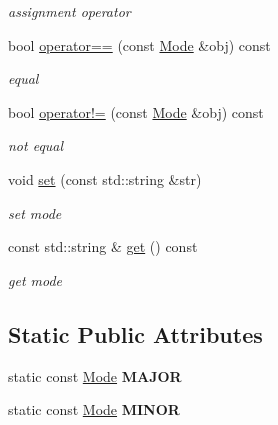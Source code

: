 \begin{DoxyCompactItemize}
\begin{DoxyCompactList}\small\item\em assignment operator \end{DoxyCompactList}\item 
bool \hyperlink{classsinsy_1_1Mode_a9a90d9c77d25798d8b4dd3c427a7cd3f}{operator==} (const \hyperlink{classsinsy_1_1Mode}{\-Mode} \&obj) const 
\begin{DoxyCompactList}\small\item\em equal \end{DoxyCompactList}\item 
bool \hyperlink{classsinsy_1_1Mode_a585d85c933d17df58e76a5ce5770a5b8}{operator!=} (const \hyperlink{classsinsy_1_1Mode}{\-Mode} \&obj) const 
\begin{DoxyCompactList}\small\item\em not equal \end{DoxyCompactList}\item 
void \hyperlink{classsinsy_1_1Mode_a406a7630df242c2e2cc0d751d684af32}{set} (const std\-::string \&str)
\begin{DoxyCompactList}\small\item\em set mode \end{DoxyCompactList}\item 
const std\-::string \& \hyperlink{classsinsy_1_1Mode_af6cddd424f3303817245cdc324ef1589}{get} () const 
\begin{DoxyCompactList}\small\item\em get mode \end{DoxyCompactList}\end{DoxyCompactItemize}
\subsection*{\-Static \-Public \-Attributes}
\begin{DoxyCompactItemize}
\item 
\hypertarget{classsinsy_1_1Mode_ae0408cf44be2a33f0da76c9f9500dadf}{static const \hyperlink{classsinsy_1_1Mode}{\-Mode} {\bfseries \-M\-A\-J\-O\-R}}\label{classsinsy_1_1Mode_ae0408cf44be2a33f0da76c9f9500dadf}

\item 
\hypertarget{classsinsy_1_1Mode_a2e0a735ec05a389546ef8c1a2ff8d125}{static const \hyperlink{classsinsy_1_1Mode}{\-Mode} {\bfseries \-M\-I\-N\-O\-R}}\label{classsinsy_1_1Mode_a2e0a735ec05a389546ef8c1a2ff8d125}

\end{DoxyCompactItemize}


